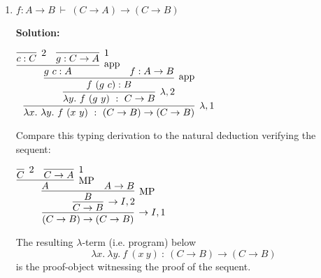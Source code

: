 \documentclass[11pt]{report}
\begin{document}
\begin{enumerate}
\begin{enumerate}
			{\bf Solution:}
				\begin{center}
					\footnotesize{$\begin{array}{c}
						\infer[\sumElim]{\sumElim \ p \ (\lambda x. \ \inl \ (f \ x)) \ (\lambda y. \ \inr \ (g \ y)) \ : \ C + D}
							{p : A + B
							&
							\infer[\lambda,1]{\lambda x. \ \inl \ (f \ x) : A \to C+D}
								{\infer[\inl]{\inl \ (f \ a) : C + D}
									{\infer[\app]{f \ a : C}
										{f : A \to C
										&
										\infer[1]{a : A}
											{}}}}
							&
							\infer[\lambda,2]{\lambda y. \ \inl \ (g \ y) : B \to C+D}
								{\infer[\inr]{\inr \ (g \ b) : C + D}
									{\infer[\app]{g \ b : D}
										{g : B \to D
										&
										\infer[2]{b : B}
											{}}}}}
					\end{array}$}
				\end{center}
			Compare this typing derivation to the natural deduction verifying the sequent: 
			$$A \lor B,\ A \to  C,\ B \to  D \vdash \ C \lor D$$
				\begin{center}
					\footnotesize{$\begin{array}{c}
						\infer[\lor E]{C \lor D}
							{A \lor B
							&
							\infer[\to I,1]{A \to C\lor D}
								{\infer[\lor I]{C \lor D}
									{\infer[\MP]{C}
										{A \to C
										&
										\infer[1]{A}
											{}}}}
							&
							\infer[\to I,2]{B \to C\lor D}
								{\infer[\lor I]{C \lor D}
									{\infer[\MP]{D}
										{B \to D
										&
										\infer[2]{B}
											{}}}}}
					\end{array}$}
				\end{center}		
			The resulting $\lambda$-term (i.e. program) below
			$$\sumElim \ p \ (\lambda x. \ \inl \ (f \ x)) \ (\lambda y. \ \inr \ (g \ y)) \ : \ C + D$$
			is the proof-object witnessing the proof of the sequent.		
		
		\item $f : A \to B \ \vdash \ (C \to A) \to (C \to B)$	
			
			{\bf Solution:}			
			\begin{center}
				$\infer[\lambda, 1]{\lambda x. \ \lambda y. \ f \ (x \ y) \ : \ (C \to B) \to (C \to B)}
					{\infer[\lambda,2]{\lambda y. \ f \ (g \ y) \ : \ C \to B}
						{\infer[\app]{f \ (g \ c) : B}
							{\infer[\app]{g \ c : A}
								{\infer[2]{c : C}{}
								&
								\infer[1]{g : C \to A}{}}
							&
							f : A \to B}}}$			
			\end{center}
			Compare this typing derivation to the natural deduction verifying the sequent:
			\begin{center}
				$\infer[\to I, 1]{(C \to B) \to (C \to B)}
					{\infer[\to I,2]{C \to B}
						{\infer[\MP]{B}
							{\infer[\MP]{A}
								{\infer[2]{C}{}
								&
								\infer[1]{C \to A}{}}
							&
							A \to B}}}$			
			\end{center}
			The resulting $\lambda$-term (i.e. program) below
			$$\lambda x. \ \lambda y. \ f \ (x \ y) \ : \ (C \to B) \to (C \to B)$$
			is the proof-object witnessing the proof of the sequent.
		

\end{enumerate}
\end{enumerate}
\end{document}
